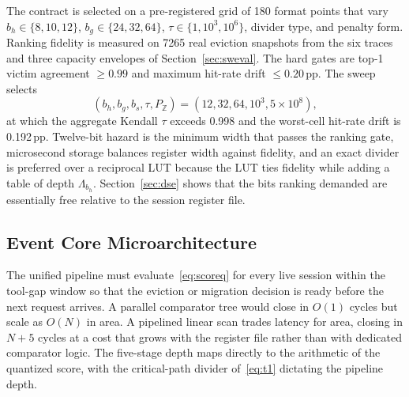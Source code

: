 The contract is selected on a pre-registered grid of 180 format
points that vary $b_{h}\in\{8,10,12\}$,
$b_{g}\in\{24,32,64\}$, $\tau\in\{1,10^{3},10^{6}\}$, divider type,
and penalty form. Ranking fidelity is measured on 7265 real eviction
snapshots from the six traces and three capacity envelopes of
Section~\ref{sec:sweval}. The hard gates are top-1 victim agreement
${\ge}0.99$ and maximum hit-rate drift ${\le}0.20$\,pp. The sweep
selects
\begin{equation}
  (b_{h},b_{g},b_{s},\tau,P_{\mathbb{Z}})
  =(12,32,64,10^{3},5\times10^{8}),
  \label{eq:lock}
\end{equation}
at which the aggregate Kendall $\tau$ exceeds 0.998 and the worst-cell
hit-rate drift is 0.192\,pp. Twelve-bit hazard is the minimum width that passes the ranking gate,
microsecond storage balances register width against fidelity, and an
exact divider is preferred over a reciprocal LUT because the LUT ties
fidelity while adding a table of depth $\Lambda_{b_{h}}$. Section~\ref{sec:dse} shows that
the bits ranking demanded are essentially free relative to the session
register file.

\subsection{Event Core Microarchitecture}
\label{sec:micro}

The unified pipeline must evaluate~\eqref{eq:scoreq} for every live
session within the tool-gap window so that the eviction or migration
decision is ready before the next request arrives. A parallel
comparator tree would close in $O(1)$ cycles but scale as $O(N)$ in
area. A pipelined linear scan trades latency for area, closing in
$N{+}5$ cycles at a cost that grows with the register file rather
than with dedicated comparator logic. The five-stage depth maps
directly to the arithmetic of the quantized score, with the
critical-path divider of~\eqref{eq:t1} dictating the pipeline depth.

